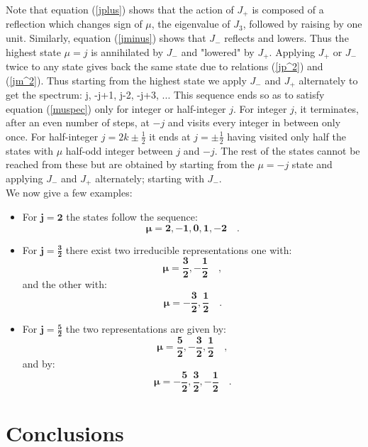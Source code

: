 Note that equation (\ref{jplus}) shows that the action of $J_+$ is
composed of a reflection which changes sign of $\mu$, the
eigenvalue of $J_3$, followed by raising by one unit. Similarly,
equation (\ref{jminus}) shows that $J_-$ reflects and lowers. Thus
the highest state $\mu = j$ is annihilated by $J_-$ and "lowered"
by $J_+$. Applying $J_+$ or $J_-$ twice to any state gives back
the same state due to relations (\ref{jp^2}) and (\ref{jm^2}).
Thus starting from the highest state we apply $J_-$ and $J_+$
alternately to get the spectrum: \beq j, -j+1, j-2, -j+3, ... \eeq
This sequence ends so as to satisfy equation (\ref{muspec}) only
for integer or half-integer $j$. For integer $j$, it terminates,
after an even number of steps, at $-j$ and visits every integer in
between only once. For half-integer $j=2k\pm\frac{1}{2}$ it ends
at $j=\pm\frac{1}{2}$ having visited only half the states with
$\mu$ half-odd integer between $j$ and $-j$. The rest of the
states cannot be reached from these but are obtained by starting
from the $\mu= -j$ state and applying $J_-$ and $J_+$ alternately;
starting with $J_-$.
\\
We now give a few examples:
\begin{itemize}
  \item
For $\mathbf{j=2}$ the states follow the sequence:
\[
\mathbf{\mu = 2, -1, 0, 1, -2}\quad.
\]
  \item
For $\mathbf{j=\frac{3}{2}}$ there exist two irreducible
representations one with:
\[
\mathbf{\mu = \frac{3}{2}, -\frac{1}{2}}\quad,
\] and the other with:
\[
\mathbf{\mu = -\frac{3}{2}, \frac{1}{2}}\quad.
\]

  \item
For $\mathbf{j=\frac{5}{2}}$ the two representations are given by:
\[
\mathbf{\mu = \frac{5}{2}, -\frac{3}{2}, \frac{1}{2}}\quad,
\] and by:
\[
\mathbf{\mu = -\frac{5}{2}, \frac{3}{2}, -\frac{1}{2}}\quad.
\]

\end{itemize}

\section{Conclusions}

